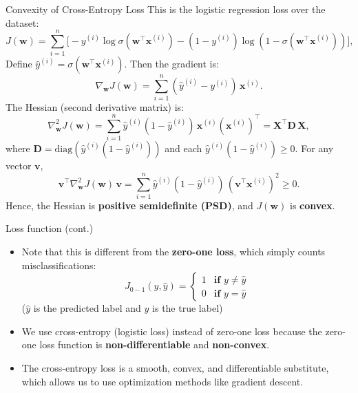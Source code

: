 \documentclass[serif, aspectratio=169]{beamer}
\begin{document}
\begin{frame}{Convexity of Cross-Entropy Loss}
\small
This is the logistic regression loss over the dataset:
\[
J(\mathbf{w}) = \sum_{i=1}^{n} \Big[ -y^{(i)} \log \sigma(\mathbf{w}^\top \mathbf{x}^{(i)}) - (1 - y^{(i)}) \log(1 - \sigma(\mathbf{w}^\top \mathbf{x}^{(i)})) \Big],
\]
Define $\hat{y}^{(i)} = \sigma(\mathbf{w}^\top \mathbf{x}^{(i)})$.  
Then the gradient is:
\[
\nabla_{\mathbf{w}} J(\mathbf{w}) = \sum_{i=1}^{n} (\hat{y}^{(i)} - y^{(i)}) \, \mathbf{x}^{(i)}.
\]
The Hessian (second derivative matrix) is:
\[
\nabla_{\mathbf{w}}^2 J(\mathbf{w}) = \sum_{i=1}^{n} \hat{y}^{(i)}(1 - \hat{y}^{(i)}) \, \mathbf{x}^{(i)} (\mathbf{x}^{(i)})^\top
= \mathbf{X}^\top \mathbf{D} \, \mathbf{X},
\]
where $\mathbf{D} = \mathrm{diag}(\hat{y}^{(i)}(1 - \hat{y}^{(i)}))$ and each $\hat{y}^{(i)}(1 - \hat{y}^{(i)}) \ge 0$.
For any vector $\mathbf{v}$,
\[
\mathbf{v}^\top \nabla_{\mathbf{w}}^2 J(\mathbf{w}) \, \mathbf{v} 
= \sum_{i=1}^{n} \hat{y}^{(i)}(1 - \hat{y}^{(i)}) \, (\mathbf{v}^\top \mathbf{x}^{(i)})^2 \ge 0.
\]
Hence, the Hessian is \textbf{positive semidefinite (PSD)}, and $J(\mathbf{w})$ is \textbf{convex}.
\end{frame}



\begin{frame}{Loss function (cont.)}
    \begin{itemize}
        \item Note that this is different from the \textbf{zero-one loss}, which simply counts misclassifications:
           \[
               J_{0-1}(y, \hat{y}) =  \begin{cases}
                    1 & \textbf{if } y \neq \hat{y} \\
                    0 & \textbf{if } y = \hat{y}
                \end{cases}
            \]
            ($\hat{y}$ is the predicted label and $y$ is the true label)
            
        \item We use cross-entropy (logistic loss) instead of zero-one loss because the zero-one loss function is \textbf{non-differentiable} and \textbf{non-convex}. 
        
        \item The cross-entropy loss is a smooth, convex, and differentiable substitute, which allows us to use optimization methods like gradient descent.
    \end{itemize}
\end{frame}
\end{document}
